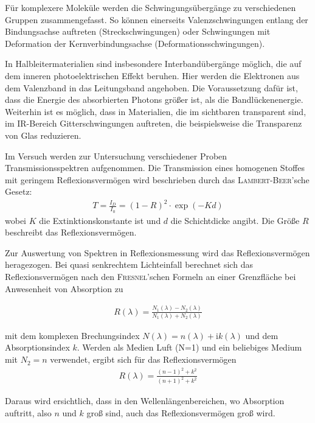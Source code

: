 \documentclass[a4paper,twoside,final]{article}
\begin{document}
Für komplexere Moleküle werden die Schwingungsübergänge zu verschiedenen Gruppen zusammengefasst. So können einerseits Valenzschwingungen entlang der Bindungsachse auftreten (Streckschwingungen) oder Schwingungen mit Deformation der Kernverbindungsachse (Deformationsschwingungen).

In Halbleitermaterialien sind insbesondere Interbandübergänge möglich, die auf dem inneren photoelektrischen Effekt beruhen. Hier werden die Elektronen aus dem Valenzband in das Leitungsband angehoben. Die Voraussetzung dafür ist, dass die Energie des absorbierten Photons größer ist, als die Bandlückenenergie. Weiterhin ist es möglich, dass in Materialien, die im sichtbaren transparent sind, im IR-Bereich Gitterschwingungen auftreten, die beispielsweise die Transparenz von Glas reduzieren.

Im Versuch werden zur Untersuchung verschiedener Proben Transmissionsspektren aufgenommen. Die Transmission eines homogenen Stoffes mit geringem Reflexionsvermögen wird beschrieben durch das \textsc{Lambert-Beer}'sche Gesetz:
\begin{align}
  T=\frac{I_D}{I_0}=(1-R)^2\cdot\exp(-Kd)
\end{align}
wobei $K$ die Extinktionskonstante ist und $d$ die Schichtdicke angibt. Die Größe $R$ beschreibt das Reflexionsvermögen.

Zur Auswertung von Spektren in Reflexionsmessung wird das Reflexionsvermögen heragezogen. Bei quasi senkrechtem Lichteinfall berechnet sich das Reflexionsvermögen nach den \textsc{Fresnel}'schen Formeln an einer Grenzfläche bei Anwesenheit von Absorption zu

\begin{align}
  R(\lambda)=\frac{N_1(\lambda)-N_2(\lambda)}{N_1(\lambda)+N_2(\lambda)}
\end{align}

mit dem komplexen Brechungsindex $N(\lambda) = n(\lambda)+\mathrm{i}k(\lambda)$  und dem Absorptionsindex $k$.
Werden als Medien Luft (N=1) und ein beliebiges Medium mit $N_2 = n$ verwendet, ergibt sich für das Reflexionsvermögen
\begin{align}
  R(\lambda)=\frac{(n-1)^2+k^2}{(n+1)^2+k^2}
\end{align}

Daraus wird ersichtlich, dass in den Wellenlängenbereichen, wo Absorption auftritt, also $n$ und $k$ groß sind, auch das Reflexionsvermögen groß wird.

\newpage
\end{document}
